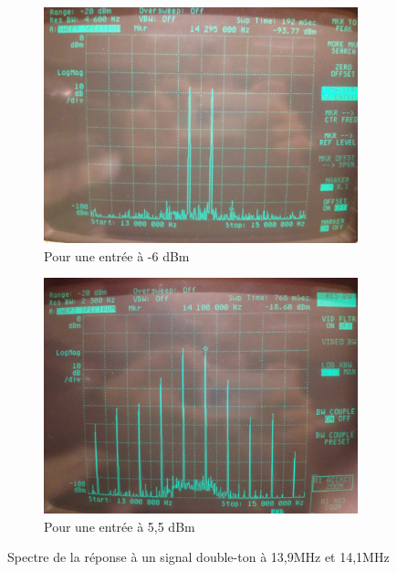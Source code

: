 \documentclass{article}
\begin{document}
\begin{figure}[h]
	\centering
	\begin{subfigure}[b]{0.43\textwidth}
		\centering
		\includegraphics[width=\textwidth]{6_3_6_0dbm}
		\caption{Pour une entrée à -6 dBm}
	\end{subfigure}
	\hfill
	\begin{subfigure}[b]{0.43\textwidth}
		\centering
		\includegraphics[width=\textwidth]{6_3_6_11x5dbm}
		\caption{Pour une entrée à 5,5 dBm}
	\end{subfigure}
	\caption{Spectre de la réponse à un signal double-ton à 13,9MHz et 14,1MHz}
	\label{fig:6_double}
\end{figure}
\end{document}
